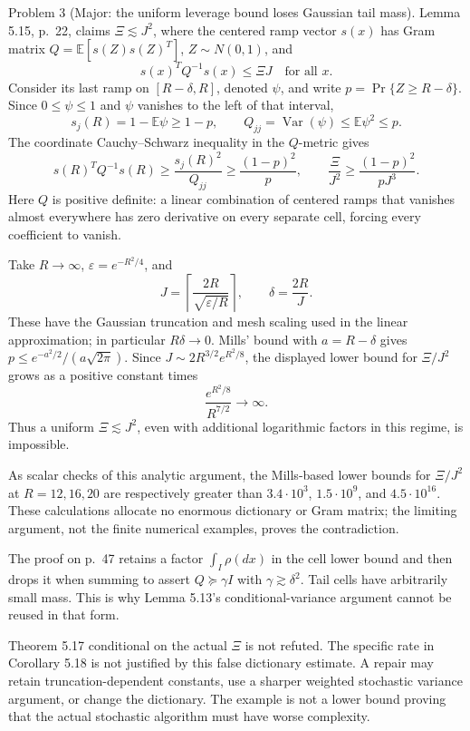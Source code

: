 \documentclass[10pt]{article}
\begin{document}
Problem 3 (Major: the uniform leverage bound loses Gaussian tail mass).  Lemma 5.15, p. 22, claims \(\Xi\lesssim J^2\), where the centered ramp vector \(s(x)\) has Gram matrix \(Q=\mathbb E[s(Z)s(Z)^T]\), \(Z\sim N(0,1)\), and \[s(x)^TQ^{-1}s(x)\leq\Xi J\quad\text{for all }x.\] Consider its last ramp on \([R-\delta,R]\), denoted \(\psi\), and write \(p=\Pr\{Z\geq R-\delta\}\). Since \(0\leq\psi\leq1\) and \(\psi\) vanishes to the left of that interval, \[s_j(R)=1-\mathbb E\psi\geq1-p,\qquad
 Q_{jj}=\mathop{\mathrm{Var}}(\psi)\leq\mathbb E\psi^2\leq p.\] The coordinate Cauchy–Schwarz inequality in the \(Q\)-metric gives \[s(R)^TQ^{-1}s(R)\geq\frac{s_j(R)^2}{Q_{jj}}
 \geq\frac{(1-p)^2}{p},\qquad
 \frac{\Xi}{J^2}\geq\frac{(1-p)^2}{pJ^3}.\] Here \(Q\) is positive definite: a linear combination of centered ramps that vanishes almost everywhere has zero derivative on every separate cell, forcing every coefficient to vanish.\par
Take \(R\to\infty\), \(\varepsilon=e^{-R^2/4}\), and \[J=\left\lceil\frac{2R}{\sqrt{\varepsilon/R}}\right\rceil,
 \qquad \delta=\frac{2R}{J}.\] These have the Gaussian truncation and mesh scaling used in the linear approximation; in particular \(R\delta\to0\). Mills’ bound with \(a=R-\delta\) gives \(p\leq e^{-a^2/2}/(a\sqrt{2\pi})\). Since \(J\sim2R^{3/2}e^{R^2/8}\), the displayed lower bound for \(\Xi/J^2\) grows as a positive constant times \[\frac{e^{R^2/8}}{R^{7/2}}\longrightarrow\infty.\] Thus a uniform \(\Xi\lesssim J^2\), even with additional logarithmic factors in this regime, is impossible.\par
As scalar checks of this analytic argument, the Mills-based lower bounds for \(\Xi/J^2\) at \(R=12,16,20\) are respectively greater than \(3.4\cdot10^3\), \(1.5\cdot10^9\), and \(4.5\cdot10^{16}\). These calculations allocate no enormous dictionary or Gram matrix; the limiting argument, not the finite numerical examples, proves the contradiction.\par
The proof on p. 47 retains a factor \(\int_I\rho(dx)\) in the cell lower bound and then drops it when summing to assert \(Q\succeq\gamma I\) with \(\gamma\gtrsim\delta^2\). Tail cells have arbitrarily small mass. This is why Lemma 5.13’s conditional-variance argument cannot be reused in that form.\par
Theorem 5.17 conditional on the actual \(\Xi\) is not refuted. The specific rate in Corollary 5.18 is not justified by this false dictionary estimate. A repair may retain truncation-dependent constants, use a sharper weighted stochastic variance argument, or change the dictionary. The example is not a lower bound proving that the actual stochastic algorithm must have worse complexity.\par
\end{document}
